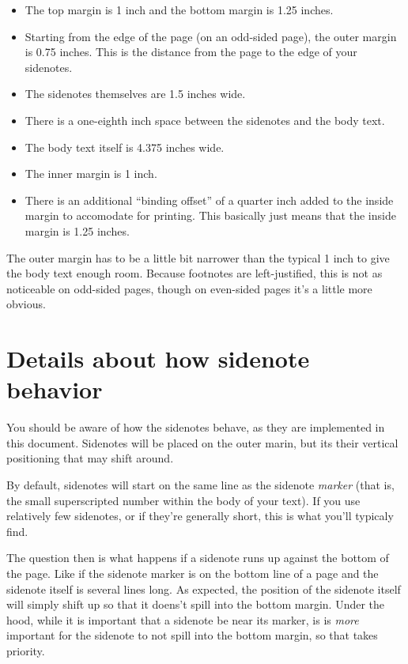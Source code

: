 \documentclass[./dissertation.tex]{subfiles}
\begin{document}
    \begin{itemize}
      \item The top margin is 1 inch and the bottom margin is 1.25 inches.
      \item Starting from the edge of the page (on an odd-sided page), the outer margin is 0.75 inches. This is the distance from the page to the edge of your sidenotes.
      \item The sidenotes themselves are 1.5 inches wide.
      \item There is a one-eighth inch space between the sidenotes and the body text.
      \item The body text itself is 4.375 inches wide.
      \item The inner margin is 1 inch.
      \item There is an additional ``binding offset'' of a quarter inch added to the inside margin to accomodate for printing. This basically just means that the inside margin is 1.25 inches.
    \end{itemize}
    The outer margin has to be a little bit narrower than the typical 1 inch to give the body text enough room. Because footnotes are left-justified, this is not as noticeable on odd-sided pages, though on even-sided pages it's a little more obvious.



    \section{Details about how sidenote behavior}

    You should be aware of how the sidenotes behave, as they are implemented in this document. Sidenotes will be placed on the outer marin, but its their vertical positioning that may shift around.

    By default, sidenotes will start on the same line as the sidenote \textit{marker} (that is, the small superscripted number within the body of your text). If you use relatively few sidenotes, or if they're generally short, this is what you'll typicaly find.

    The question then is what happens if a sidenote runs up against the bottom of the page. Like if the sidenote marker is on the bottom line of a page and the sidenote itself is several lines long. As expected, the position of the sidenote itself will simply shift up so that it doens't spill into the bottom margin. Under the hood, while it is important that a sidenote be near its marker, is is \textit{more} important for the sidenote to not spill into the bottom margin, so that takes priority.
\end{document}
